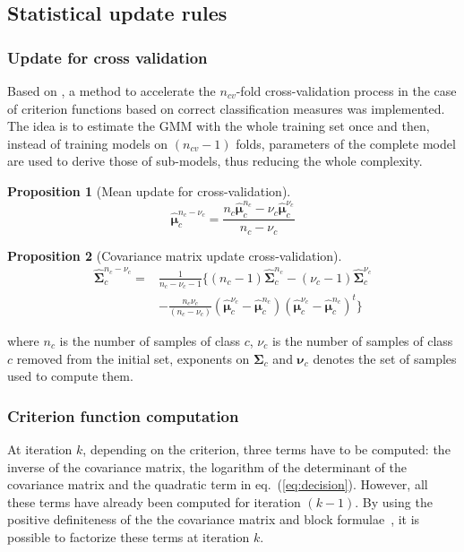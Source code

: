 \documentclass[journal]{IEEEtran}
\newtheorem{prop}{Proposition}
\begin{document}
\subsection{Statistical update rules}
        \subsubsection{Update for cross validation}
        \label{sec:update-cv}
        Based on \cite{fauvel2015fast}, a method to accelerate the $n_{cv}$-fold cross-validation process in the case of criterion functions based on correct classification measures was implemented. The idea is to estimate the GMM with the whole training set once and then, instead of training models on $(n_{cv}-1)$ folds, parameters of the complete model are used to derive those of sub-models, thus reducing the whole complexity.

        \begin{prop}[Mean update for cross-validation]
            \label{eq:update-cv1}
            \begin{equation*}
                \boldsymbol{\hat{\mu}}_c^{n_c-\nu_c} = \frac{n_c \boldsymbol{\hat{\mu}}_c^{n_c} - \nu_c \boldsymbol{\hat{\mu}}_c^{\nu_c}}{n_c - \nu_c} \nonumber
            \end{equation*}
        \end{prop}
        \begin{prop}[Covariance matrix update cross-validation]
            \label{eq:update-cv2}
            \begin{align*}
              \boldsymbol{\hat{\Sigma}}_c^{n_c-\nu_c} = &\frac{1}{n_c-\nu_c-1} \biggl\{ (n_c-1) \boldsymbol{\hat{\Sigma}}_c^{n_c} - (\nu_c-1)\boldsymbol{\hat{\Sigma}}_c^{\nu_c} \nonumber \\
                                                        &- \frac{n_c \nu_c}{(n_c-\nu_c)} (\boldsymbol{\hat{\mu}}_c^{\nu_c}-\boldsymbol{\hat{\mu}}_c^{n_c})(\boldsymbol{\hat{\mu}}_c^{\nu_c}-\boldsymbol{\hat{\mu}}_c^{n_c})^t \biggr\} \nonumber
            \end{align*}
        \end{prop}
        \noindent where $n_c$ is the number of samples of class $c$, $\nu_c$ is the number of samples of class $c$ removed from the initial set, exponents on $\boldsymbol{\Sigma}_c$ and $\boldsymbol{\nu}_c$ denotes the set of samples used to compute them.

        \subsubsection{Criterion function computation}
        \label{sec:update-crit}
        At iteration $k$, depending on the criterion, three terms have
        to  be computed:  the inverse  of the  covariance matrix,  the
        logarithm of the determinant of  the covariance matrix and the
        quadratic term in  eq.~(\ref{eq:decision}). However, all these
        terms  have already  been computed  for iteration  $(k-1)$. By
        using the  positive definiteness of the  the covariance matrix
        and block formulae~\cite[Chapter 9.2]{webb2003statistical}, it
        is possible to factorize these terms at iteration $k$.
\end{document}
